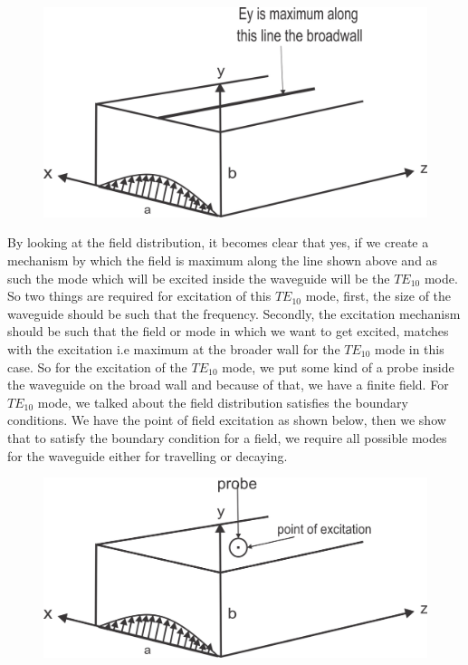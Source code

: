 \begin{figure}[h]
\centering
\includegraphics[width=1\linewidth]{./graphics/group39-2}
\caption{}
\end{figure}

 By looking at the field distribution, it becomes clear that yes, if we create a mechanism by which the field is maximum along the line shown above and as such the mode which will be excited inside the waveguide will be the $TE_{10}$ mode. So two things are required for excitation of this $TE_{10}$ mode, first, the size of the waveguide should be such that the frequency. Secondly, the excitation mechanism should be such that the field or mode in which we want to get excited, matches with the excitation i.e maximum at the broader wall for the $TE_{10}$ mode in this case. So for the excitation of the $TE_{10}$ mode, we put some kind of a probe inside the waveguide on the broad wall and because of that, we have a finite field. For $TE_{10}$ mode, we talked about the field distribution satisfies the boundary conditions. We have the point of field excitation as shown below, then we show that to satisfy the boundary condition for a field, we require all possible modes for the waveguide either for travelling or decaying.
\begin{figure}[h]
\centering
\includegraphics[width=1\linewidth]{./graphics/group39-3}
\caption{}
\end{figure}

